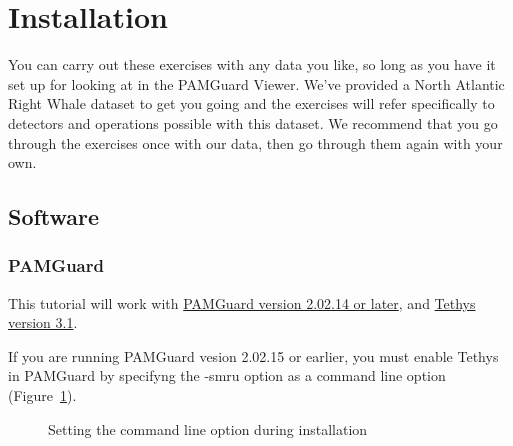 \documentclass[
]{article}
\begin{document}
\section{Installation}\label{installation}

You can carry out these exercises with any data you like, so long as you
have it set up for looking at in the PAMGuard Viewer. We've provided a
North Atlantic Right Whale dataset to get you going and the exercises
will refer specifically to detectors and operations possible with this
dataset. We recommend that you go through the exercises once with our
data, then go through them again with your own.

\subsection{Software}\label{software}

\subsubsection{PAMGuard}\label{pamguard}

This tutorial will work with
\href{https://www.pamguard.org/downloadsurvey.html}{PAMGuard version
2.02.14 or later}, and \href{https://zenodo.org/records/13626338}{Tethys
version 3.1}.

If you are running PAMGuard vesion 2.02.15 or earlier, you must enable
Tethys in PAMGuard by specifyng the -smru option as a command line
option (Figure~\ref{fig-smru}).

\begin{figure}


\caption{\label{fig-smru}Setting the command line option during
installation}

\end{figure}%
\end{document}
